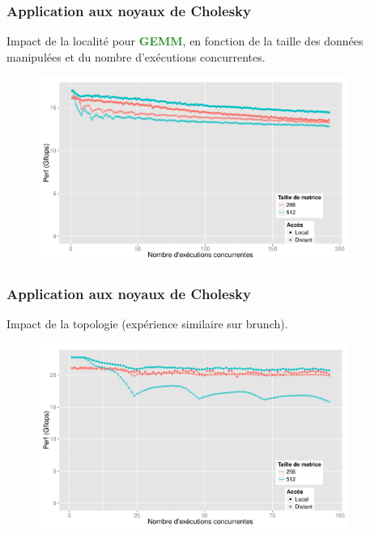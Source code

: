 \documentclass[xcolor={usenames,dvipsnames,svgnames,table}, aspectratio=43]{beamer}
\newcommand{\gemmcolor}[1]{\textcolor{ForestGreen}{\textbf{#1}}\xspace}
\newcommand{\gemm}{\gemmcolor{GEMM}}
\begin{document}
\begin{frame}
\frametitle{Application aux noyaux de Cholesky}

Impact de la localité pour \gemm, en fonction de la taille des données manipulées et du nombre d'exécutions concurrentes.

\begin{figure}
  \centering
  \includegraphics[width=0.9\textwidth]{graph/kernel_dgemm_remote_idchire.pdf}
\end{figure}


\end{frame}


\begin{frame}
\frametitle{Application aux noyaux de Cholesky}

Impact de la topologie (expérience similaire sur brunch).

\begin{figure}
  \centering
  \includegraphics[width=0.9\textwidth]{graph/kernel_dgemm_remote_brunch.pdf}
\end{figure}


\end{frame}
\end{document}

